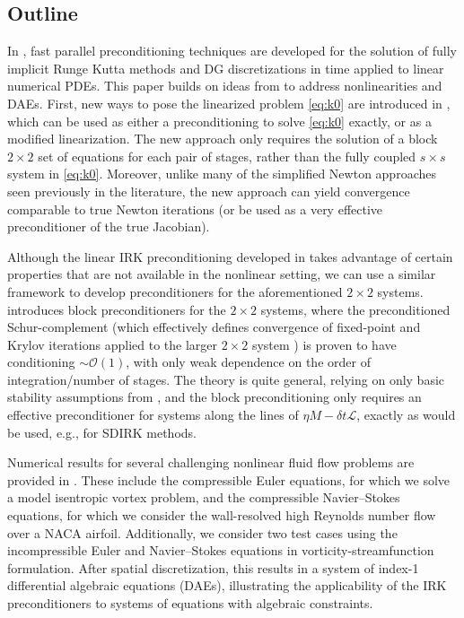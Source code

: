\documentclass[review]{siamart}
\begin{document}
\subsection{Outline}\label{sec:intro:outline}

In \cite{irk1}, fast parallel preconditioning techniques are developed for
the solution of fully implicit Runge Kutta methods and DG discretizations
in time applied to linear numerical PDEs. This paper builds on ideas from
\cite{irk1} to address nonlinearities and DAEs. First, new ways to pose the
linearized problem \eqref{eq:k0} are introduced in ,
which can be used as either a preconditioning to solve \eqref{eq:k0} exactly,
or as a modified linearization. The new approach only requires the solution
of a block $2\times 2$ set of equations for each pair of stages, rather than
the fully coupled $s\times s$ system in \eqref{eq:k0}. Moreover, unlike many
of the simplified Newton approaches seen previously in the literature, the
new approach can yield convergence comparable to true Newton iterations (or
be used as a very effective preconditioner of the true Jacobian).

Although the linear IRK preconditioning developed in \cite{irk1} takes
advantage of certain properties that are not available in the nonlinear
setting, we can use a similar framework to develop preconditioners for the
aforementioned $2\times 2$ systems.  introduces block
preconditioners for the $2\times 2$ systems, where the preconditioned
Schur-complement (which effectively defines convergence of fixed-point
and Krylov iterations applied to the larger $2\times 2$ system
\cite{2x2block}) is proven to have conditioning $\sim\mathcal{O}(1)$,
with only weak dependence on the order of integration/number of stages.
The theory is quite general, relying on only basic stability assumptions
from , and the block preconditioning only requires
an effective preconditioner for systems along the lines of
$\eta M - \delta t\mathcal{L}$, exactly as would be used, e.g., for
SDIRK methods.

Numerical results for several challenging nonlinear fluid flow problems are
provided in . These include the compressible Euler equations,
for which we solve a model isentropic vortex problem, and the compressible
Navier--Stokes equations, for which we consider the wall-resolved high Reynolds
number flow over a NACA airfoil. Additionally, we consider two test cases using
the incompressible Euler and Navier--Stokes equations in
vorticity-streamfunction formulation. After spatial discretization, this results
in a system of index-1 differential algebraic equations (DAEs), illustrating the
applicability of the IRK preconditioners to systems of equations with algebraic
constraints.
\end{document}

